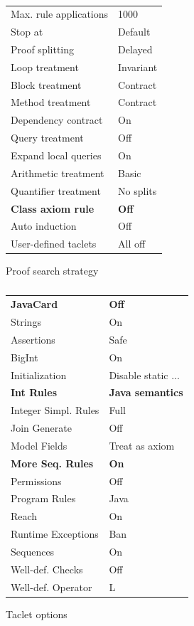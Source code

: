 \documentclass[runningheads]{llncs}
\theoremstyle{remark}
\begin{document}
\begin{table}
\begin{subtable}[t]{.5\textwidth}
    \begin{tabular}[t]{l@{\hskip6pt}|@{\hskip6pt}l}
    Max. rule applications & 1000 \\
    Stop at & Default \\
    Proof splitting & Delayed \\
    Loop treatment & Invariant \\
    Block treatment & Contract \\
    Method treatment & Contract \\
    Dependency contract & On \\
    Query treatment & Off \\
    Expand local queries & On \\
    Arithmetic treatment & Basic \\
    Quantifier treatment & No splits \\
    \textbf{Class axiom rule} & \textbf{Off} \\
    Auto induction & Off \\
    User-defined taclets & All off
    \end{tabular}
    \medskip
    \caption{Proof search strategy}
    \label{tab:proof-strategy}
\end{subtable}%
\begin{subtable}[t]{.5\textwidth}
    \begin{tabular}[t]{l@{\hskip6pt}|@{\hskip6pt}l}
    \textbf{JavaCard} & \textbf{Off} \\
    Strings & On \\
    Assertions & Safe \\
    BigInt & On \\
    Initialization & Disable static ...  \\
    \textbf{Int Rules} & \textbf{Java semantics} \\
    Integer Simpl. Rules & Full \\
    Join Generate & Off \\
    Model Fields & Treat as axiom \\
    \textbf{More Seq. Rules} & \textbf{On} \\
    Permissions & Off \\
    Program Rules & Java \\
    Reach & On \\
    Runtime Exceptions & Ban \\
    Sequences & On \\
    Well-def. Checks & Off \\
    Well-def. Operator & L
    \end{tabular}
    \medskip
    \caption{Taclet options}
    \label{tab:taclet-options}
\end{subtable}
    \vspace*{-22pt}
    \caption{}
    \vspace*{-20pt}
\end{table}
\end{document}
